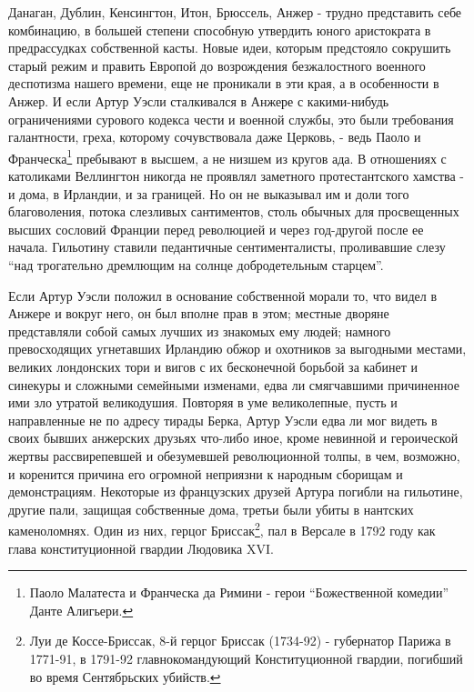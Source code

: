 \documentclass[
  oneside,
  12pt,
  titlepage]{book}
\begin{document}
Данаган, Дублин, Кенсингтон, Итон, Брюссель, Анжер - трудно представить себе комбинацию, в большей степени способную утвердить юного аристократа в предрассудках собственной касты. Новые идеи, которым предстояло сокрушить старый режим и править Европой до возрождения безжалостного военного деспотизма нашего времени, еще не проникали в эти края, а в особенности в Анжер. И если Артур Уэсли сталкивался в Анжере с какими-нибудь ограничениями сурового кодекса чести и военной службы, это были требования галантности, греха, которому сочувствовала даже Церковь, - ведь Паоло и Франческа\footnote{Паоло Малатеста и Франческа да Римини - герои ``Божественной комедии'' Данте Алигьери.} пребывают в высшем, а не низшем из кругов ада. В отношениях с католиками Веллингтон никогда не проявлял заметного протестантского хамства - и дома, в Ирландии, и за границей. Но он не выказывал им и доли того благоволения, потока слезливых сантиментов, столь обычных для просвещенных высших сословий Франции перед революцией и через год-другой после ее начала. Гильотину ставили педантичные сентименталисты, проливавшие слезу ``над трогательно дремлющим на солнце добродетельным старцем''.

Если Артур Уэсли положил в основание собственной морали то, что видел в Анжере и вокруг него, он был вполне прав в этом; местные дворяне представляли собой самых лучших из знакомых ему людей; намного превосходящих угнетавших Ирландию обжор и охотников за выгодными местами, великих лондонских тори и вигов с их бесконечной борьбой за кабинет и синекуры и сложными семейными изменами, едва ли смягчавшими причиненное ими зло утратой великодушия. Повторяя в уме великолепные, пусть и направленные не по адресу тирады Берка, Артур Уэсли едва ли мог видеть в своих бывших анжерских друзьях что-либо иное, кроме невинной и героической жертвы рассвирепевшей и обезумевшей революционной толпы, в чем, возможно, и коренится причина его огромной неприязни к народным сборищам и демонстрациям. Некоторые из французских друзей Артура погибли на гильотине, другие пали, защищая собственные дома, третьи были убиты в нантских каменоломнях. Один из них, герцог Бриссак\footnote{Луи де Коссе-Бриссак, 8-й герцог Бриссак (1734-92) - губернатор Парижа в 1771-91, в 1791-92 главнокомандующий Конституционной гвардии, погибший во время Сентябрьских убийств.}, пал в Версале в 1792 году как глава конституционной гвардии Людовика XVI.
\end{document}
